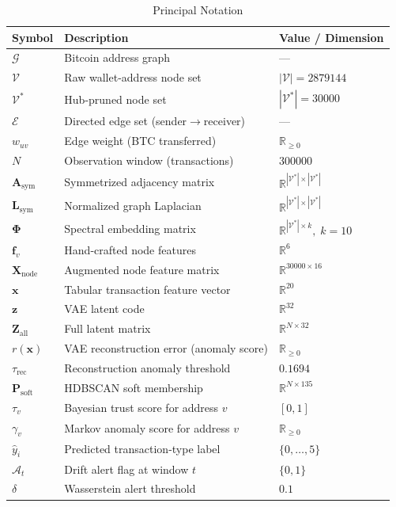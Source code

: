 \documentclass[journal]{IEEEtran}
\begin{document}
\begin{table}[!t]
  \renewcommand{\arraystretch}{1.18}
  \caption{Principal Notation}
  \label{tab:notation}
  \centering
  \small
  \begin{tabular}{@{}lll@{}}
    \toprule
    \textbf{Symbol} & \textbf{Description} & \textbf{Value / Dimension} \\
    \midrule
    $\mathcal{G}$ & Bitcoin address graph & --- \\
    $\mathcal{V}$ & Raw wallet-address node set & $|\mathcal{V}|=\num{2879144}$ \\
    $\mathcal{V}^{*}$ & Hub-pruned node set & $|\mathcal{V}^{*}|=\num{30000}$ \\
    $\mathcal{E}$ & Directed edge set (sender$\to$receiver) & --- \\
    $w_{uv}$ & Edge weight (BTC transferred) & $\mathbb{R}_{\geq 0}$ \\
    $N$ & Observation window (transactions) & $\num{300000}$ \\
    $\mathbf{A}_{\mathrm{sym}}$ & Symmetrized adjacency matrix & $\mathbb{R}^{|\mathcal{V}^{*}|\times|\mathcal{V}^{*}|}$ \\
    $\mathbf{L}_{\mathrm{sym}}$ & Normalized graph Laplacian & $\mathbb{R}^{|\mathcal{V}^{*}|\times|\mathcal{V}^{*}|}$ \\
    $\boldsymbol{\Phi}$ & Spectral embedding matrix & $\mathbb{R}^{|\mathcal{V}^{*}|\times k},\;k=10$ \\
    $\mathbf{f}_{v}$ & Hand-crafted node features & $\mathbb{R}^{6}$ \\
    $\mathbf{X}_{\mathrm{node}}$ & Augmented node feature matrix & $\mathbb{R}^{\num{30000}\times 16}$ \\
    $\mathbf{x}$ & Tabular transaction feature vector & $\mathbb{R}^{20}$ \\
    $\mathbf{z}$ & VAE latent code & $\mathbb{R}^{32}$ \\
    $\mathbf{Z}_{\mathrm{all}}$ & Full latent matrix & $\mathbb{R}^{N\times 32}$ \\
    $r(\mathbf{x})$ & VAE reconstruction error (anomaly score) & $\mathbb{R}_{\geq 0}$ \\
    $\tau_{\mathrm{rec}}$ & Reconstruction anomaly threshold & $0.1694$ \\
    $\mathbf{P}_{\mathrm{soft}}$ & HDBSCAN soft membership & $\mathbb{R}^{N\times 135}$ \\
    $\tau_{v}$ & Bayesian trust score for address $v$ & $[0,1]$ \\
    $\gamma_{v}$ & Markov anomaly score for address $v$ & $\mathbb{R}_{\geq 0}$ \\
    $\hat{y}_{i}$ & Predicted transaction-type label & $\{0,\ldots,5\}$ \\
    $\mathcal{A}_{t}$ & Drift alert flag at window $t$ & $\{0,1\}$ \\
    $\delta$ & Wasserstein alert threshold & $0.1$ \\
    \bottomrule
  \end{tabular}
\end{table}
\end{document}
